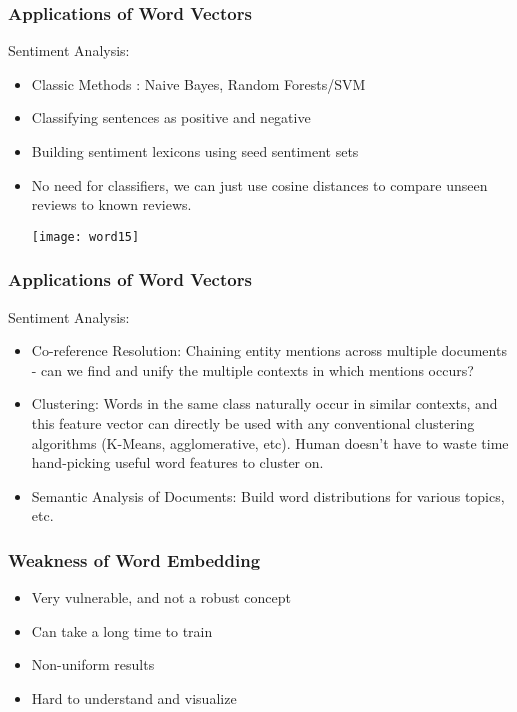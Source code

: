 \begin{frame}[fragile]\frametitle{Applications of Word Vectors}
Sentiment Analysis:
\begin{itemize}
\item Classic Methods : Naive Bayes, Random Forests/SVM
\item Classifying sentences as positive and negative
\item Building sentiment lexicons using seed sentiment sets
\item No need for classifiers, we can just use cosine distances to compare unseen reviews to known reviews.

\begin{center}
\texttt{[image: word15]}
\end{center}
\end{itemize}
\end{frame}

\begin{frame}[fragile]\frametitle{Applications of Word Vectors}
Sentiment Analysis:
\begin{itemize}
\item Co-reference Resolution: Chaining entity mentions across multiple documents  - can we find and unify the multiple contexts in which mentions occurs?
\item Clustering: Words in the same class naturally occur in similar contexts,  and this feature vector can directly be used with any conventional clustering algorithms (K-Means, agglomerative, etc). Human doesn't have to waste time hand-picking useful word features to cluster on.
\item Semantic Analysis of Documents: Build word distributions for various topics, etc.

\end{itemize}
\end{frame}

\begin{frame}[fragile]\frametitle{Weakness of Word Embedding}
\begin{itemize}
\item Very vulnerable, and not a robust concept
\item Can take a long time to train
\item Non-uniform results
\item Hard to understand and visualize
\end{itemize}
\end{frame}

